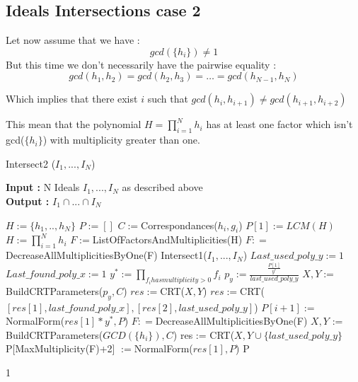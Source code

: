 \documentclass{article}
\begin{document}
\subsection{Ideals Intersections case 2}

Let now assume that we have : 
$$gcd(\{h_{i}\}) \neq 1$$
But this time we don't necessarily have the pairwise equality :
$$gcd(h_{1},h_{2}) = gcd(h_{2},h_{3}) = \dots = gcd(h_{N-1},h_{N}) $$

Which implies that there exist $i$ such that $gcd(h_{i},h_{i+1}) \neq gcd(h_{i+1},h_{i+2})$

This mean that the polynomial $H = \prod_{i=1}^{N} h_{i}$ has at least one factor which isn't gcd($\{h_{i}\}$) with multiplicity greater than one.


\begin{algorithm}
    \caption{Intersect2 ($I_{1},...,I_{N}$)}\label{alg:intersect-2-ideals-diff-gcd}
    \textbf{Input : } N Ideals $I_{1},...,I_{N}$ as described above \\
    \textbf{Output : }$I_{1} \cap ...\cap I_ {N}$
\begin{algorithmic}
    \State $H := \{h_{1},..,h_{N}\}$
    \State $P:=[]$
    \State $C := $Correspondances($h_{i},g_{i}$)
    \State $P[1] := LCM(H)$
    \State $H := \prod^{N}_{i=1} h_{i}$
    \State $F:= $ListOfFactorsAndMultiplicities(H)
    \State $F: = $DecreaseAllMultiplicitiesByOne(F)
        \State \Return Intersect1($I_{1},...,I_{N}$)
    \EndIf
    \State $Last\_used\_poly\_y := 1$
    \State $Last\_found\_poly\_x := 1$
        \State $y^{*}:= \prod_{f_{i} has multiplicity > 0} f_{i}$
        \State $p_y:=\frac{\frac{P[1]}{y^{*}}}{last\_used\_poly\_y}$
        \State $X, Y:=$BuildCRTParameters($p_y, C$)
        \State $res := $CRT($X,Y$)
            \State $res := $CRT($[res[1],last\_found\_poly\_x],[res[2],last\_used\_poly\_y]$)
        \EndIf
        \State $P[i+1] := $NormalForm($res[1]*y^{*},P$)
        \State $F: = $DecreaseAllMultiplicitiesByOne(F)
    \EndFor
    \State $X,Y$ := BuildCRTParameters($GCD(\{h_{i}\}),C$)
    \State res := CRT($X,Y\cup\{last\_used\_poly\_y\}$
    \State P[MaxMultiplicity(F)+2] $:= $NormalForm($res[1],P$)
    \State \Return P

1\end{algorithmic}
\end{algorithm}
\nocite{*}
\printbibliography
\end{document}
